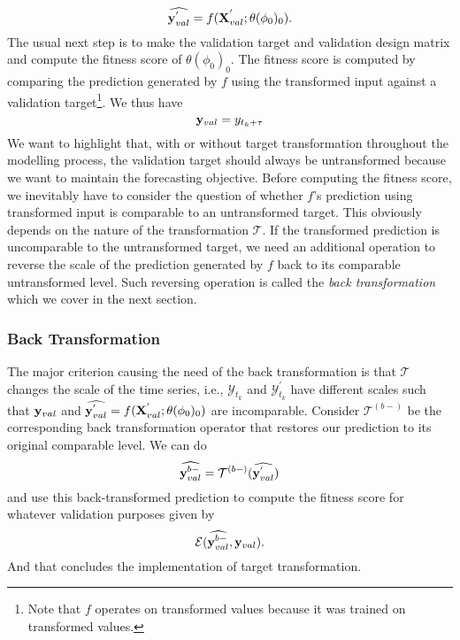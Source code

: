 \begin{equation*}
    \widehat{\mathbf{y}^{'}_{val}} = f(\mathbf{X}^{'}_{val} ; \theta(\phi_0)_0).
\end{equation*}
The usual next step is to make the validation target and validation design matrix and compute the fitness score of $\theta(\phi_0)_0$. The fitness score is computed by comparing the prediction generated by $f$ using the transformed input against a validation target\footnote{Note that $f$ operates on transformed values because it was trained on transformed values.}. We thus have
\begin{equation*}
    \mathbf{y}_{val} = y_{t_k + \tau}
\end{equation*}
We want to highlight that, with or without target transformation throughout the modelling process, the validation target should always be untransformed because we want to maintain the forecasting objective. Before computing the fitness score, we inevitably have to consider the question of whether $f$'s prediction using transformed input is comparable to an untransformed target. This obviously depends on the nature of the transformation $\mathcal{T}$. If the transformed prediction is uncomparable to the untransformed target, we need an additional operation to reverse the scale of the prediction generated by $f$ back to its comparable untransformed level. Such reversing operation is called the \textit{back transformation} which we cover in the next section.

\subsubsection{Back Transformation}
The major criterion causing the need of the back transformation is that $\mathcal{T}$ changes the scale of the time series, i.e., $\mathcal{Y}_{t_k}$ and $\mathcal{Y}^{'}_{t_k}$ have different scales such that $\mathbf{y}_{val}$ and $\widehat{\mathbf{y}^{'}_{val}} = f(\mathbf{X}^{'}_{val};\theta(\phi_0)_0)$ are incomparable. Consider $\mathcal{T}^{(b-)}$ be the corresponding back transformation operator that restores our prediction to its original comparable level. We can do
\begin{equation*}
    \widehat{\mathbf{y}^{b-}_{val}} = \mathcal{T}^{(b-)}(\widehat{\mathbf{y}^{'}_{val}})
\end{equation*}
and use this back-transformed prediction to compute the fitness score for whatever validation purposes given by
\begin{equation*}
    \mathcal{E}(\widehat{\mathbf{y}^{b-}_{val}}, \mathbf{y}_{val}).
\end{equation*}
And that concludes the implementation of target transformation.

